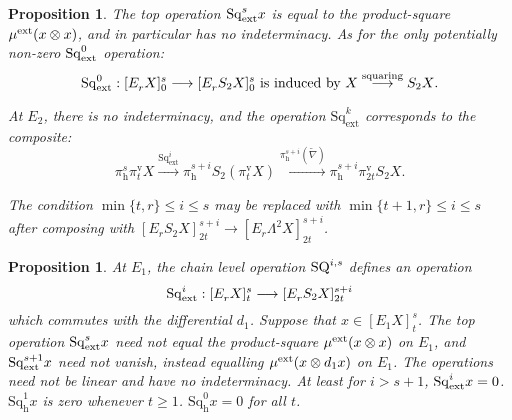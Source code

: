 \documentclass[11pt]{amsart} \renewcommand{\baselinestretch}{1.2}
\theoremstyle{plain}
\newtheorem{prop}[thm]{Proposition}
\numberwithin{equation}{section} %
\theoremstyle{plain}
\newtheorem{prop}[thm]{Proposition}
\numberwithin{equation}{chapter} %
\renewcommand{\to}{\longrightarrow}
\newcommand{\ExtCohOp}{\mathrm{Sq}_\mathrm{ext}}
\newcommand{\Sq}{\mathrm{Sq}}
\newcommand{\Edownup}[5]{[E_{#1}^{#2}#3]^{#4}_{#5}}
\newcommand{\uver}{^\mathrm{v}}
\newcommand{\dhor}{_\mathrm{h}}
\newcommand{\Sqh}{\mathrm{Sq}\dhor}
\begin{document}
\begin{second quadrant homotopy sseq operations}
\begin{prop}
The \emph{top} operation $\Sq^s_\textup{ext}x$ is equal to the product-square $\mu^\textup{ext}(x\otimes x)$, and in particular has no indeterminacy. 
As for the only potentially non-zero $\Sq^0_\textup{ext}$ operation:
\[\Sq^0_\textup{ext}:\Edownup{r}{}{X}{s}{0}\to \Edownup{r}{}{S_2X}{s}{0}\text{ is induced by $X\overset{\textup{squaring}}{\to}S_2X$}.\]

At $E_2$, there is no indeterminacy, and the operation $\ExtCohOp^k$ corresponds to the composite:
\[\pi\dhor^s\pi\uver_t X
\overset{\ExtCohOp^i}{\to} 
\pi\dhor^{s+i}S_2(\pi\uver_t X)
\overset{\pi\dhor^{s+i}(\widetilde{\nabla})}{\to}
\pi\dhor^{s+i}\pi\uver_{2t}S_2 X.
\]

The condition $\min\{t,r\}\leq i\leq s$ may be replaced with $\min\{t+1,r\}\leq i\leq s$ after composing with $\Edownup{r}{}{S_2X}{s+i}{2t}\to \Edownup{r}{}{\Lambda^2X}{s+i}{2t}$.
\end{prop}

\begin{prop}
\label{prop on e1 steens 2}
At $E_1$, 
the chain level operation $\textup{SQ}^{i,s}$ defines an operation
\[\Sq^i_\textup{ext}:\Edownup{r}{}{X}{s}{t}\to \Edownup{r}{}{S_2X}{s+i}{2t}\]
which commutes with the differential $d_{1}$. Suppose that $x\in \Edownup{1}{}{X}{s}{t}$.
The top operation $\Sq^s_\textup{ext}x$ need not equal the product-square $\mu^\textup{ext}(x\otimes x)$ on $E_1$, and
$\Sq^{s+1}_\textup{ext}x$ need not vanish, instead equalling $\mu^\textup{ext}(x\otimes d_1x)$ on $E_1$.
The operations need not be linear and have no indeterminacy. At least for $i>s+1$, $\Sq^i_\textup{ext}x=0$. $\Sqh^1x$ is zero whenever $t\geq1$. $\Sqh^0x=0$ for all $t$.
\end{prop}



\end{second quadrant homotopy sseq operations}
\end{document}
